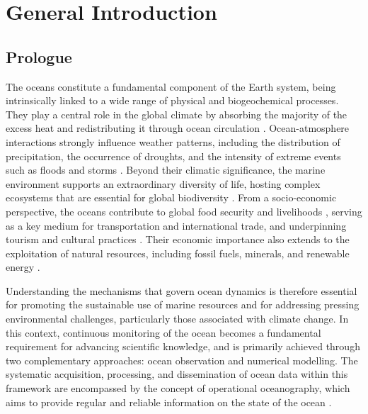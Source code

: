 \chapter{General Introduction}
\newpage
\section{Prologue}
The oceans constitute a fundamental component of the Earth system, being intrinsically linked to a wide range of physical and biogeochemical processes. They play a central role in the global climate by absorbing the majority of the excess heat and redistributing it through ocean circulation \parencite{vonschuckmann2023heat}. Ocean-atmosphere interactions strongly influence weather patterns, including the distribution of precipitation, the occurrence of droughts, and the intensity of extreme events such as floods and storms \parencite{seo2023ocean, chen2024analysis}. Beyond their climatic significance, the marine environment supports an extraordinary diversity of life, hosting complex ecosystems that are essential for global biodiversity \parencite{talukder2022climate, ipcc2022changing}. From a socio-economic perspective, the oceans contribute to global food security and livelihoods \parencite{free2022expanding}, serving as a key medium for transportation and international trade, and underpinning tourism and cultural practices \parencite{jouffray2020blue}. Their economic importance also extends to the exploitation of natural resources, including fossil fuels, minerals, and renewable energy \parencite{oecd2016ocean}.

Understanding the mechanisms that govern ocean dynamics is therefore essential for promoting the sustainable use of marine resources and for addressing pressing environmental challenges, particularly those associated with climate change. In this context, continuous monitoring of the ocean becomes a fundamental requirement for advancing scientific knowledge, and is primarily achieved through two complementary approaches: ocean observation and numerical modelling. The systematic acquisition, processing, and dissemination of ocean data within this framework are encompassed by the concept of operational oceanography, which aims to provide regular and reliable information on the state of the ocean \parencite{fanjul2024promoting, serafy2023eurogoos}.

